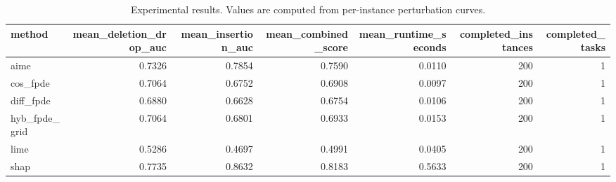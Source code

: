 \begin{table}[t]
\caption{Experimental results. Values are computed from per-instance perturbation curves.}
\label{tab:main_results_computed}
\centering
\begin{tabular}{lrrrrrr}
\toprule
method & mean\_deletion\_drop\_auc & mean\_insertion\_auc & mean\_combined\_score & mean\_runtime\_seconds & completed\_instances & completed\_tasks \\
\midrule
aime & 0.7326 & 0.7854 & 0.7590 & 0.0110 & 200 & 1 \\
cos\_fpde & 0.7064 & 0.6752 & 0.6908 & 0.0097 & 200 & 1 \\
diff\_fpde & 0.6880 & 0.6628 & 0.6754 & 0.0106 & 200 & 1 \\
hyb\_fpde\_grid & 0.7064 & 0.6801 & 0.6933 & 0.0153 & 200 & 1 \\
lime & 0.5286 & 0.4697 & 0.4991 & 0.0405 & 200 & 1 \\
shap & 0.7735 & 0.8632 & 0.8183 & 0.5633 & 200 & 1 \\
\bottomrule
\end{tabular}

\end{table}
